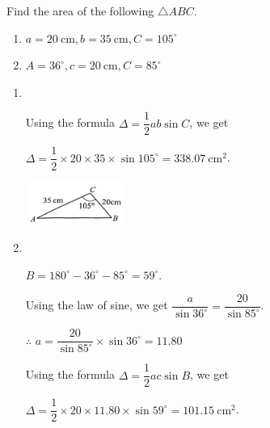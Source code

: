 \documentclass{report}
\begin{document}
    \begin{question}
        Find the area of the following $\triangle ABC$.
        \vspace{-1em}
        \begin{enumerate}[label=(\alph*)]
            \item $a=20 \mathrm{~cm}, b=35 \mathrm{~cm}, C=105^{\circ}$
            \item $A=36^{\circ}, c=20 \mathrm{~cm}, C=85^{\circ}$
        \end{enumerate}

        \sol{}
        \begin{enumerate}[label=(\alph*)]
            \item \parbox[t]{0.9\textwidth}{
                ~
                \vspace{-1.3em}
                \begin{vwcol}[widths={0.7,0.3}, sep=8mm, rule=0pt]
                    Using the formula $\Delta=\dfrac{1}{2}ab\sin C$, we get 
            
            \noindent $\Delta=\dfrac{1}{2} \times 20 \times 35 \times \sin 105^{\circ}=338.07 \mathrm{~cm}^{2}$.

            \includegraphics[width=0.25\textwidth]{assets/10-38.jpg}
                \end{vwcol}
            }

            \item \parbox[t]{0.9\textwidth}{
                ~
                \vspace{-1.1em}
                \begin{vwcol}[widths={0.7,0.3}, sep=8mm, rule=0pt]
                    $B = 180^\circ - 36^\circ - 85^\circ = 59^\circ$. 
            
                    \noindent Using the law of sine, we get $\dfrac{a}{\sin 36^\circ} = \dfrac{20}{\sin 85^\circ}$.

                    \noindent $\therefore$ $a = \dfrac{20}{\sin 85^\circ} \times \sin 36^\circ = 11.80$

                    \noindent Using the formula $\Delta = \dfrac{1}{2}ac\sin B$, we get 
                    
                    \noindent $\Delta = \dfrac{1}{2} \times 20 \times 11.80 \times \sin 59^\circ = 101.15 \mathrm{~cm}^{2}$.


\end{vwcol}}
\end{enumerate}
\end{question}
\end{document}
